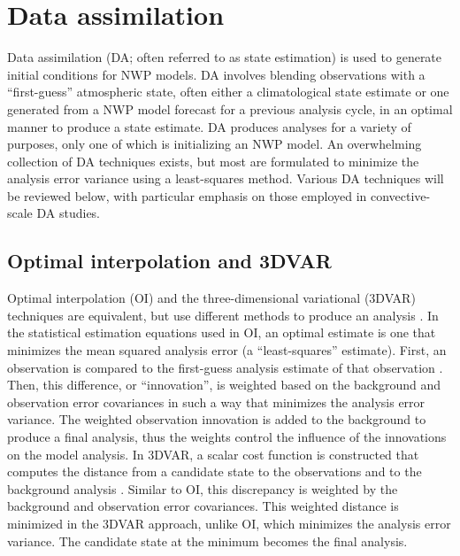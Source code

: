 \pagebreak
\section{Data assimilation}
Data assimilation (DA; often referred to as state estimation) is used to generate initial conditions for NWP models. DA involves blending observations with a “first-guess” atmospheric state, often either a climatological state estimate or one generated from a NWP model forecast for a previous analysis cycle, in an optimal manner to produce a state estimate. DA produces analyses for a variety of purposes, only one of which is initializing an NWP model. An overwhelming collection of DA techniques exists, but most are formulated to minimize the analysis error variance using a least-squares method. Various DA techniques will be reviewed below, with particular emphasis on those employed in convective-scale DA studies.

\subsection{Optimal interpolation and 3DVAR}
Optimal interpolation (OI) and the three-dimensional variational (3DVAR) techniques are equivalent, but use different methods to produce an analysis \citep{lorenc86}. In the statistical estimation equations used in OI, an optimal estimate is one that minimizes the mean squared analysis error (a “least-squares” estimate). First, an observation is compared to the first-guess analysis estimate of that observation \citep{gandin63}. Then, this difference, or “innovation”, is weighted based on the background and observation error covariances in such a way that minimizes the analysis error variance. The weighted observation innovation is added to the background to produce a final analysis, thus the weights control the influence of the innovations on the model analysis. In 3DVAR, a scalar cost function is constructed that computes the distance from a candidate state to the observations and to the background analysis \citep{sasaki70}. Similar to OI, this discrepancy is weighted by the background and observation error covariances. This weighted distance is minimized in the 3DVAR approach, unlike OI, which minimizes the analysis error variance. The candidate state at the minimum becomes the final analysis.

